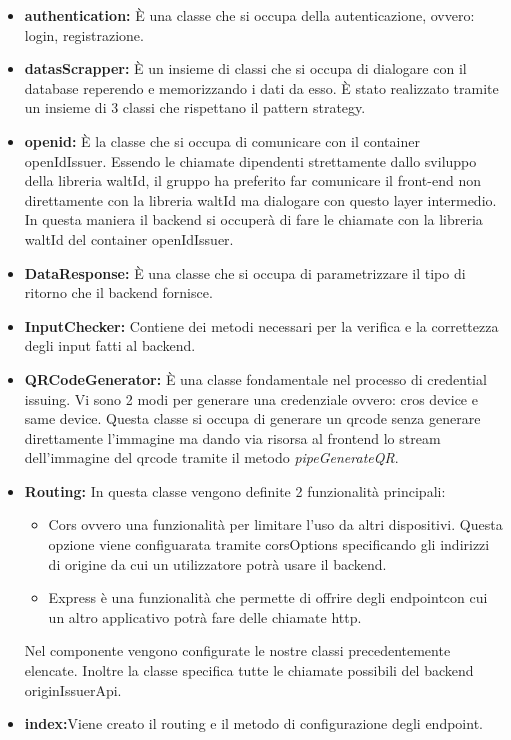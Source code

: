 \begin{itemize}
    \item \textbf{authentication:} È una classe che si occupa della autenticazione, ovvero: login, registrazione. 
    \item \textbf{datasScrapper:} È un insieme di classi che si occupa di dialogare con il database reperendo e memorizzando i dati da esso. È stato realizzato tramite un insieme di 3 classi che rispettano il pattern strategy. 
    \item \textbf{openid:} È la classe che si occupa di comunicare con il container openIdIssuer. Essendo le chiamate dipendenti strettamente dallo sviluppo della libreria waltId, il gruppo ha preferito far comunicare il front-end non direttamente con la libreria waltId ma dialogare con questo layer intermedio. In questa maniera il backend si occuperà di fare le chiamate con la libreria waltId del container openIdIssuer.
    \item \textbf{DataResponse:} È una classe che si occupa di parametrizzare il tipo di ritorno che il backend fornisce.
    \item \textbf{InputChecker:} Contiene dei metodi necessari per la verifica e la correttezza degli input fatti al backend.
    \item \textbf{QRCodeGenerator:} È una classe fondamentale nel processo di credential issuing. Vi sono 2 modi per generare una credenziale ovvero: cros device e same device. Questa classe si occupa di generare un qrcode senza generare direttamente l'immagine ma dando via risorsa al frontend lo stream dell'immagine del qrcode tramite il metodo \textit{pipeGenerateQR}.
    \item \textbf{Routing:} In questa classe vengono definite 2 funzionalità principali:
     \begin{itemize}
     \item Cors ovvero una funzionalità per limitare l'uso da altri dispositivi. Questa opzione viene configuarata tramite corsOptions specificando gli indirizzi di origine da cui un utilizzatore potrà usare il backend. 
     \item Express è una funzionalità che permette di offrire degli endpoint\glo con cui un altro applicativo potrà fare delle chiamate http. 
     \end{itemize}
    Nel componente vengono configurate le nostre classi precedentemente elencate.
    Inoltre la classe specifica tutte le chiamate possibili del backend originIssuerApi.
    \item \textbf{index:}Viene creato il routing e il metodo di configurazione degli endpoint.
\end{itemize}

